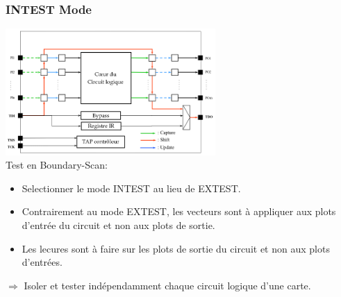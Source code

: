 \documentclass[10pt]{article}
\begin{document}
\begin{multicols}{2}
  \subsubsection{INTEST Mode}
  \includegraphics[width=8cm]{intest.png}\\
  Test en Boundary-Scan:
  \begin{itemize}
    \itemsep0em
    \item Selectionner le mode INTEST au lieu de EXTEST.
    \item Contrairement au mode EXTEST, les vecteurs sont à appliquer aux plots
    d'entrée du circuit et non aux plots de sortie.
    \item Les lecures sont à faire sur les plots de sortie du circuit et non aux
    plots d'entrées.
  \end{itemize}
  $\Rightarrow$ Isoler et tester indépendamment chaque circuit logique d'une
  carte.

\end{multicols}
\end{document}

